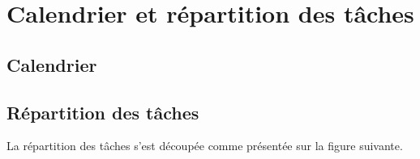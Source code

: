 \chapter{Calendrier et répartition des tâches}

\section{Calendrier}


\section{Répartition des tâches}
La répartition des tâches s'est découpée comme présentée sur la figure suivante.


